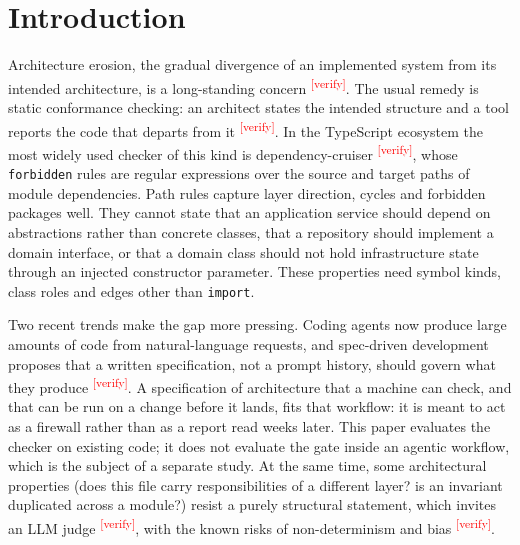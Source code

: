\documentclass[10pt,a4paper]{article}
\newcommand{\citeneeded}[1]{\cite{#1}\textsuperscript{\textcolor{red}{\tiny[verify]}}}
\newcommand{\dc}{dependency-cruiser}
\begin{document}
\begin{abstract}
\end{abstract}

\section{Introduction}\label{sec:intro}

Architecture erosion, the gradual divergence of an implemented system from its intended architecture, is a
long-standing concern \citeneeded{desilva2012erosion,rosik2011drift}. The usual remedy is static conformance checking:
an architect states the intended structure and a tool reports the code that departs from it
\citeneeded{murphy1995reflexion,knodel2007comparison,passos2010static}. In the TypeScript ecosystem the most widely
used checker of this kind is \dc{} \citeneeded{depcruise}, whose \texttt{forbidden} rules are regular expressions over
the source and target paths of module dependencies. Path rules capture layer direction, cycles and forbidden packages
well. They cannot state that an application service should depend on abstractions rather than concrete classes,
that a repository should implement a domain interface, or that a domain class should not hold infrastructure state
through an injected constructor parameter. These properties need symbol kinds, class roles and edges other than
\texttt{import}.

Two recent trends make the gap more pressing. Coding agents now produce large amounts of code from natural-language
requests, and spec-driven development proposes that a written specification, not a prompt history, should govern what
they produce \citeneeded{speckit2025,kiro2025}. A specification of architecture that a machine can check, and that
can be run on a change before it lands, fits that workflow: it is meant to act as a firewall rather than as a report
read weeks later. This paper evaluates the checker on existing code; it does not evaluate the gate inside an
agentic workflow, which is the subject of a separate study.
At the same time, some architectural properties (does this file carry responsibilities of a different layer? is an
invariant duplicated across a module?) resist a purely structural statement, which invites an LLM judge
\citeneeded{zheng2023judging}, with the known risks of non-determinism and bias
\citeneeded{wang2023fair,panickssery2024self}.
\end{document}
